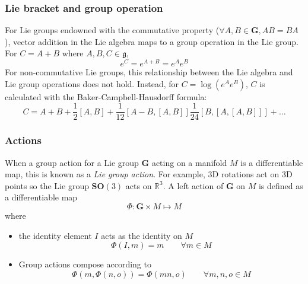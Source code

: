 		\subsubsection{Lie bracket and group operation}			
			For Lie groups endowned with the commutative property ($\forall A,B \in \mathbf{G}, AB = BA$), vector addition in the Lie algebra maps to a group operation in the Lie group. For $C = A + B$ where $A,B,C \in \mathfrak{g}$,
			\begin{equation}
				e^C = e^{A+B} = e^Ae^B
			\end{equation}
			For non-commutative Lie groups, this relationship between the Lie algebra and Lie group operations does not hold. Instead, for $C = \log{\left(e^Ae^B\right)} $, $C$ is calculated with the Baker-Campbell-Hausdorff formula:
			\begin{equation}
				C = A + B + \frac{1}{2}[A,B] + \frac{1}{12}[A-B,[A,B]]  \frac{1}{24}[B,[A,[A,B]]] + \dots
			\end{equation}	
		
		\subsubsection{Actions}
			When a group action for a Lie group $\mathbf{G}$ acting on a manifold $M$ is a differentiable map, this is known as a \textit{Lie group action}. For example, 3D rotations act on 3D points so the Lie group $\mathbf{SO}(3)$ acts on $\mathbb{R}^3$. A left action of $\mathbf{G}$ on $M$ is defined as a differentiable map
			\begin{equation}
				\Phi: \mathbf{G} \times M \mapsto M
			\end{equation}
			where
			\begin{itemize}
			\item the identity element $I$ acts as the identity on $M$
				\begin{equation}
					\Phi(I,m) = m \hspace{2em} \forall m \in M
				\end{equation}
			\item Group actions compose according to
				\begin{equation}
					\Phi(m,\Phi(n,o)) = \Phi(mn,o) \hspace{2em} \forall m,n,o \in M
				\end{equation}
			\end{itemize}
		
